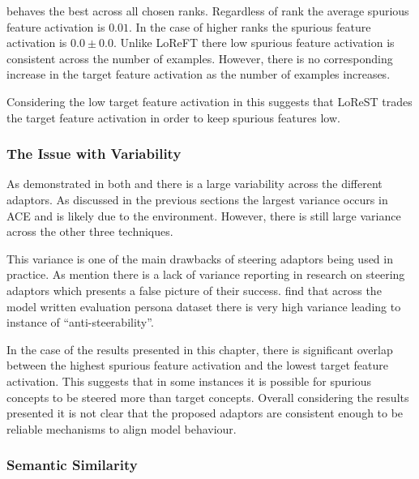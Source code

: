  behaves the best across all chosen ranks.
Regardless of rank the average spurious feature activation is $0.01$.
In the case of higher ranks the spurious feature activation is $0.0 \pm 0.0$.
Unlike LoReFT there low spurious feature activation is consistent across the number of examples.
However, there is no corresponding increase in the target feature activation as the number of examples increases.

Considering the low target feature activation in  this suggests that LoReST trades the target feature activation in order to keep spurious features low.

\subsubsection{The Issue with Variability}
\label{sec:variability}

As demonstrated in both  and  there is a large variability across the different adaptors.
As discussed in the previous sections the largest variance occurs in ACE and is likely due to the environment.
However, there is still large variance across the other three techniques.

This variance is one of the main drawbacks of steering adaptors being used in practice.
As \citet{steerability} mention there is a lack of variance reporting in research on steering adaptors which presents a false picture of their success.
\citet{steerability} find that across the model written evaluation persona dataset \citep{mwe} there is very high variance leading to instance of ``anti-steerability''.

In the case of the results presented in this chapter, there is significant overlap between the highest spurious feature activation and the lowest target feature activation.
This suggests that in some instances it is possible for spurious concepts to be steered more than target concepts.
Overall considering the results presented it is not clear that the proposed adaptors are consistent enough to be reliable mechanisms to align model behaviour.

\subsubsection{Semantic Similarity}

